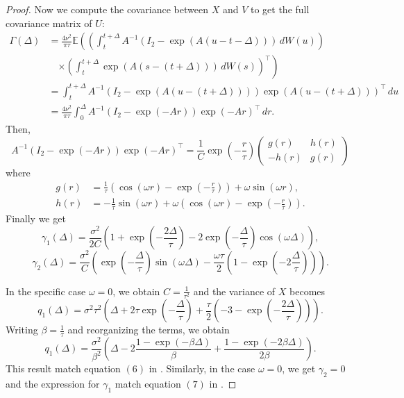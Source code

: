 \documentclass[aoas]{imsart}
\theoremstyle{definition}
\theoremstyle{remark}
\theoremstyle{remark}
\newcommand {\E}{\mathbb{E}}
\newcommand {\1}{\mathbb{1}}
\begin{document}
\begin{proof}
Now we compute the covariance between   $X$ and $V$ to get the full covariance matrix of $U$:
\begin{align*}
    \Gamma(\Delta) &= \frac{4\nu^2}{\pi \tau} \E\left(\left( \int_t^{t+\Delta} A^{-1}(I_2-\exp(A(u-t-\Delta))) \, dW(u)\right) \right. \\
    &\quad \left. \times \left(\int_{t}^{t+\Delta} \exp(A(s-(t+\Delta))) \, dW(s)\right)^\top\right) \\
    &= \int_t^{t+\Delta} A^{-1}(I_2-\exp(A(u-(t+\Delta)))) \exp(A(u-(t+\Delta)))^\top \, du \\
    &= \frac{4\nu^2}{\pi \tau} \int_0^{\Delta} A^{-1}(I_2-\exp(-Ar)) \exp(-Ar)^\top \, dr.
\end{align*}
	Then, 
	\[A^{-1}(I_2-\exp(-Ar)) \exp(-Ar)^\top=\frac{1}{C}\exp\left(-\frac{r}{\tau} \right) \begin{pmatrix} g(r) & h(r) \\ -h(r) & g(r) \end{pmatrix}\]
	where 
\begin{align*}
    g(r) &= \frac{1}{\tau} \left(\cos(\omega r) - \exp\left( -\frac{r}{\tau} \right)\right) 
    + \omega \sin(\omega r), \\
    h(r) &= -\frac{1}{\tau} \sin(\omega r) 
    + \omega \left(\cos(\omega r) - \exp\left( -\frac{r}{\tau}\right)\right).
\end{align*}
	Finally we get
	\[
	\gamma_1(\Delta)=\frac{\sigma^2}{2C}\left( 1+\exp\left( -\frac{2\Delta}{\tau}\right)-2\exp\left( -\frac{\Delta}{\tau}\right) \cos(\omega \Delta)\right),
	\]
	\[\gamma_2(\Delta)=\frac{\sigma^2}{C}\left( \exp\left( -\frac{\Delta}{\tau}\right) \sin(\omega \Delta)-\frac{\omega \tau}{2} \left(1-\exp\left( -2 \frac{\Delta}{\tau}\right) \right)\right).\]
	
	In the specific case $\omega=0$, we obtain $C=\frac{1}{\tau^2}$ and the variance of  $X$ becomes 
	\[q_1(\Delta)=\sigma^2 \tau^2\left( \Delta +2\tau\exp\left( -\frac{\Delta}{\tau}\right)+\frac{\tau}{2}\left( -3 -\exp\left( -\frac{2\Delta}{\tau}\right) \right)\right).
	\]
	Writing $\beta=\frac{1}{\tau}$ and reorganizing the terms, we obtain
	\begin{equation}q_1(\Delta)=\frac{\sigma^2}{\beta^2}\left(\Delta -2 \frac{1-\exp(-\beta \Delta)}{\beta}+\frac{1-\exp(-2\beta \Delta)}{2\beta}\right).
	\end{equation}
	This result match equation $(6)$ in \citep{johnson_continuous_2008}. Similarly, in the case $\omega=0$, we get $\gamma_2=0$ and the expression for $\gamma_1$ match equation $(7)$ in \citep{johnson_continuous_2008}.
	
\end{proof}
\end{document}
